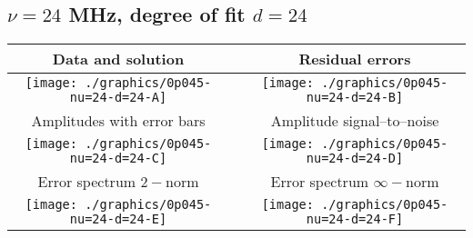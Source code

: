 

% 

\clearpage{}
\break{}

\subsection{$\nu = 24$ MHz, degree of fit $d = 24$}

\begin{table}[h]
    \begin{center}
        \begin{tabular}{ccc}
            Data and solution & \quad & Residual errors \\\hline
            \texttt{[image: ./graphics/0p045-nu=24-d=24-A]} &&
            \texttt{[image: ./graphics/0p045-nu=24-d=24-B]} \\[15pt]
            Amplitudes with error bars && Amplitude signal--to--noise \\\hline
            \texttt{[image: ./graphics/0p045-nu=24-d=24-C]} &&
            \texttt{[image: ./graphics/0p045-nu=24-d=24-D]} \\[15pt]
            Error spectrum $2-$norm && Error spectrum $\infty-$norm \\\hline
            \texttt{[image: ./graphics/0p045-nu=24-d=24-E]} &&
            \texttt{[image: ./graphics/0p045-nu=24-d=24-F]} \\[15pt]
        \end{tabular}
    \end{center}
\label{fig:elev=45, nu=24}
\end{table}



\endinput
